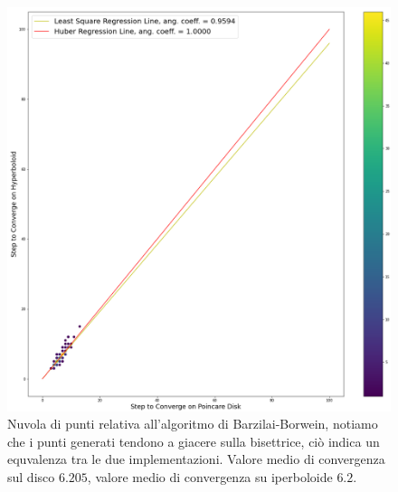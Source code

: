 \documentclass[a4paper, 12pt]{article}
\begin{document}
\begin{figure}[H] %
    \centering\includegraphics[width=1\textwidth]{barzilai_borwein.png}
    \caption{Nuvola di punti relativa all'algoritmo di Barzilai-Borwein, notiamo che i punti generati tendono a giacere sulla bisettrice, ciò indica un equvalenza tra le due implementazioni. Valore medio di convergenza sul disco $6.205$, valore medio di convergenza su iperboloide $6.2$.}
\end{figure}
\end{document}
